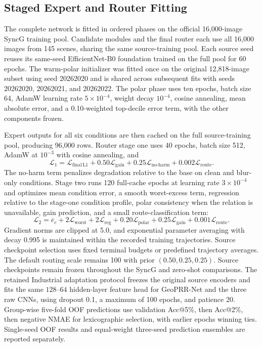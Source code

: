 \documentclass[electronics,article,submit,oneauthor]{Definitions/mdpi}
\newcommand{\modelname}{GeoPRR-Net\xspace}
\begin{document}
\subsection{Staged Expert and Router Fitting}
\label{subsec:training}

The complete network is fitted in ordered phases on the official 16,000-image SyncG training pool. Candidate modules and the final router each use all 16,000 images from 145 scenes, sharing the same source-training pool. Each source seed reuses its same-seed EfficientNet-B0 foundation trained on the full pool for 60 epochs. The warm-polar initializer was fitted once on the original 12,818-image subset using seed 20262020 and is shared across subsequent fits with seeds 20262020, 20262021, and 20262022. The polar phase uses ten epochs, batch size 64, AdamW learning rate $5\times10^{-4}$, weight decay $10^{-4}$, cosine annealing, mean absolute error, and a 0.10-weighted top-decile error term, with the other components frozen.

Expert outputs for all six conditions are then cached on the full source-training pool, producing 96,000 rows. Router stage one uses 40 epochs, batch size 512, AdamW at $10^{-3}$ with cosine annealing, and
\begin{equation}
\mathcal{L}_1=\mathcal{L}_{\mathrm{final\,L1}}+0.50\mathcal{L}_{\mathrm{gain}}
+0.25\mathcal{L}_{\mathrm{no\mbox{-}harm}}+0.002\mathcal{L}_{\mathrm{route}}.
\label{eq:router_stage1}
\end{equation}
The no-harm term penalizes degradation relative to the base on clean and blur-only conditions. Stage two runs 120 full-cache epochs at learning rate $3\times10^{-4}$ and optimizes mean condition error, a smooth worst-excess term, regression relative to the stage-one condition profile, polar consistency when the relation is unavailable, gain prediction, and a small route-classification term:
\begin{equation}
\mathcal{L}_2=\overline{e}_{c}+2\mathcal{L}_{\mathrm{worst}}+2\mathcal{L}_{\mathrm{reg}}
+0.20\mathcal{L}_{\mathrm{polar}}+0.25\mathcal{L}_{\mathrm{gain}}+0.001\mathcal{L}_{\mathrm{route}}.
\label{eq:router_stage2}
\end{equation}
Gradient norms are clipped at 5.0, and exponential parameter averaging with decay 0.995 is maintained within the recorded training trajectories. Source checkpoint selection uses fixed terminal budgets or predefined trajectory averages. The default routing scale remains 100 with prior $(0.50,0.25,0.25)$. Source checkpoints remain frozen throughout the SyncG and zero-shot comparisons. The retained Industrial adaptation protocol freezes the original source encoders and fits the same $128$--$64$ hidden-layer feature head for \modelname and the three raw CNNs, using dropout 0.1, a maximum of 100 epochs, and patience 20. Group-wise five-fold OOF predictions use validation Acc@5\%, then Acc@2\%, then negative NMAE for lexicographic selection, with earlier epochs winning ties. Single-seed OOF results and equal-weight three-seed prediction ensembles are reported separately.
\end{document}

